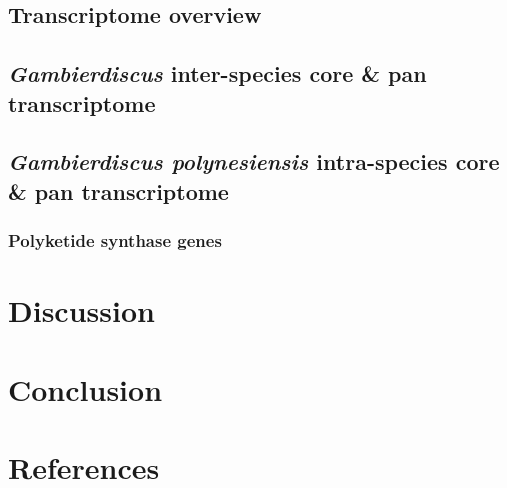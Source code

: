 \documentclass[12pt]{article}
\begin{document}
\subsection*{Transcriptome overview}

\subsection*{\emph{Gambierdiscus} inter-species core \& pan transcriptome}

\subsection*{\emph{Gambierdiscus polynesiensis} intra-species core \& pan transcriptome}

\subsubsection*{Polyketide synthase genes}
\newpage
\section*{Discussion}

\newpage
\section*{Conclusion}

\newpage
\section*{References}

\newpage


\end{document}
